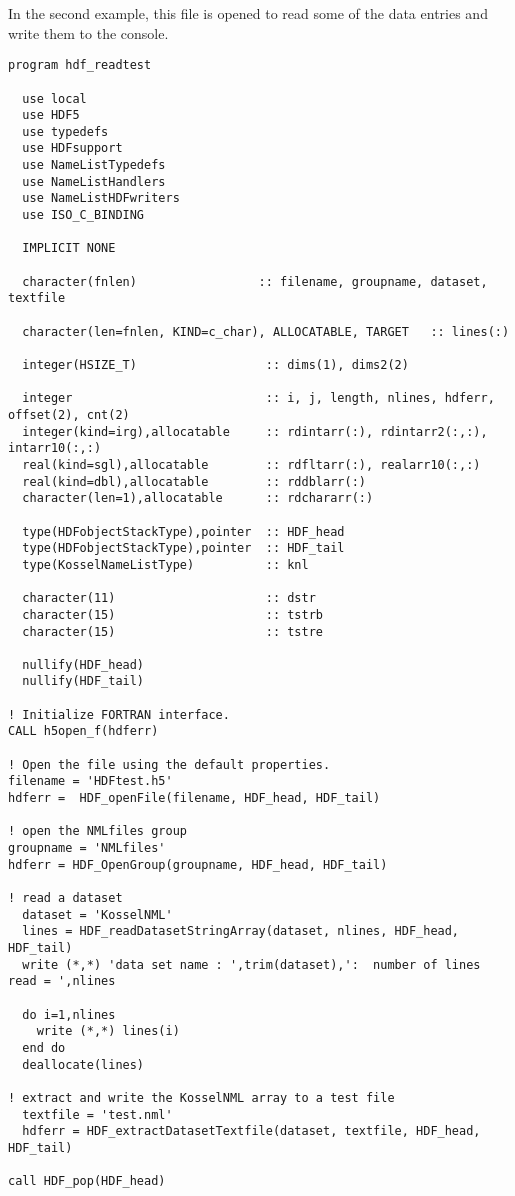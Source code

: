 \documentclass[DIV=calc, paper=letter, fontsize=11pt]{scrartcl}	 %
\begin{document}
In the second example, this file is opened to read some of the data entries and write them to the console.
{\small\begin{verbatim}
program hdf_readtest

  use local
  use HDF5
  use typedefs
  use HDFsupport
  use NameListTypedefs
  use NameListHandlers
  use NameListHDFwriters
  use ISO_C_BINDING
  
  IMPLICIT NONE

  character(fnlen)                 :: filename, groupname, dataset, textfile
  
  character(len=fnlen, KIND=c_char), ALLOCATABLE, TARGET   :: lines(:) 

  integer(HSIZE_T)                  :: dims(1), dims2(2)

  integer                           :: i, j, length, nlines, hdferr, offset(2), cnt(2)
  integer(kind=irg),allocatable     :: rdintarr(:), rdintarr2(:,:), intarr10(:,:)
  real(kind=sgl),allocatable        :: rdfltarr(:), realarr10(:,:)
  real(kind=dbl),allocatable        :: rddblarr(:)
  character(len=1),allocatable      :: rdchararr(:)

  type(HDFobjectStackType),pointer  :: HDF_head
  type(HDFobjectStackType),pointer  :: HDF_tail
  type(KosselNameListType)          :: knl

  character(11)                     :: dstr
  character(15)                     :: tstrb
  character(15)                     :: tstre

  nullify(HDF_head)
  nullify(HDF_tail)

! Initialize FORTRAN interface.
CALL h5open_f(hdferr)

! Open the file using the default properties.
filename = 'HDFtest.h5'
hdferr =  HDF_openFile(filename, HDF_head, HDF_tail)

! open the NMLfiles group
groupname = 'NMLfiles'
hdferr = HDF_OpenGroup(groupname, HDF_head, HDF_tail)

! read a dataset
  dataset = 'KosselNML'
  lines = HDF_readDatasetStringArray(dataset, nlines, HDF_head, HDF_tail) 
  write (*,*) 'data set name : ',trim(dataset),':  number of lines read = ',nlines

  do i=1,nlines
    write (*,*) lines(i)
  end do
  deallocate(lines)

! extract and write the KosselNML array to a test file 
  textfile = 'test.nml'
  hdferr = HDF_extractDatasetTextfile(dataset, textfile, HDF_head, HDF_tail)

call HDF_pop(HDF_head)


\end{verbatim}}
\end{document}
